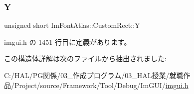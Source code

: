 \subsubsection{\texorpdfstring{Y}{Y}}
{\footnotesize\ttfamily unsigned short Im\+Font\+Atlas\+::\+Custom\+Rect\+::Y}



 imgui.\+h の 1451 行目に定義があります。



この構造体詳解は次のファイルから抽出されました\+:\begin{DoxyCompactItemize}
\item 
C\+:/\+H\+A\+L/\+P\+G関係/03\+\_\+作成プログラム/03\+\_\+\+H\+A\+L授業/就職作品/\+Project/source/\+Framework/\+Tool/\+Debug/\+Im\+G\+U\+I/\mbox{\hyperlink{imgui_8h}{imgui.\+h}}\end{DoxyCompactItemize}
